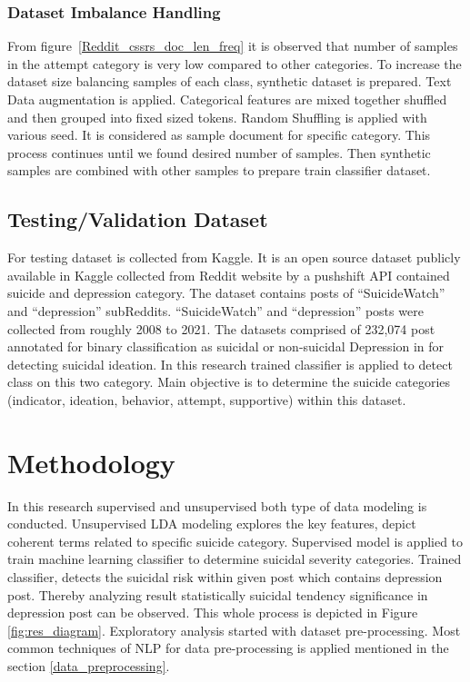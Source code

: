 \documentclass[sn-mathphys,Numbered]{sn-jnl}%
\theoremstyle{thmstyleone}%
\theoremstyle{thmstyletwo}%
\theoremstyle{thmstylethree}%
\begin{document}
\subsubsection{Dataset Imbalance Handling}
From figure~\ref{Reddit_cssrs_doc_len_freq} it is observed that number of samples in the attempt category is very low compared to other categories. To increase the dataset size balancing samples of each class, synthetic dataset is prepared. Text Data augmentation \cite{bayer2022survey} is applied.
Categorical features are mixed together shuffled and then grouped into fixed sized tokens. Random Shuffling is applied with various seed. It is considered as sample document for specific category. This process continues until we found desired number of samples. Then synthetic samples are combined with other samples to prepare train classifier dataset. 
\subsection{Testing/Validation Dataset} 
For testing dataset is collected from Kaggle. It is an open source dataset publicly available in Kaggle collected from Reddit website by a pushshift API contained suicide and depression category. The dataset contains posts of \enquote{SuicideWatch} and \enquote{depression} subReddits. \enquote{SuicideWatch} and \enquote{depression} posts were collected from roughly 2008 to 2021. The datasets comprised of 232,074 post annotated for binary classification as suicidal or non-suicidal Depression in \cite{aldhyani2022detecting} for detecting suicidal ideation. In this research trained classifier is applied to detect class on this two category. Main objective is to determine the suicide categories (indicator, ideation, behavior, attempt, supportive) within this dataset. 
\section{Methodology}\label{methodolo}
In this research supervised and unsupervised both type of data modeling is conducted. Unsupervised LDA modeling explores the key features, depict coherent terms related to specific suicide category. Supervised model is applied to train machine learning classifier to determine suicidal severity categories. Trained classifier, detects the suicidal risk within given post which contains depression post. Thereby analyzing result statistically suicidal tendency significance in depression post can be observed. This whole process is depicted in Figure \ref{fig:res_diagram}. Exploratory analysis started with dataset pre-processing. Most common techniques of NLP for data pre-processing is applied mentioned in the section \ref{data_preprocessing}. 
\end{document}
